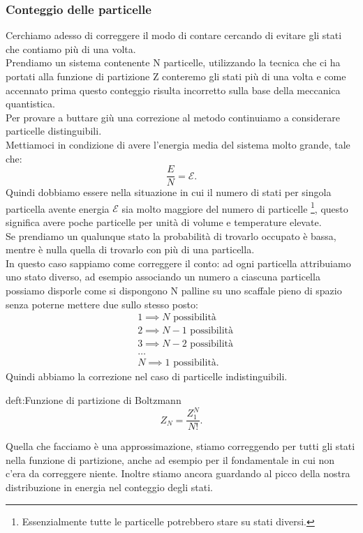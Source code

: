 \subsubsection{Conteggio delle particelle}%
\label{subsub:Conteggio delle particelle}
Cerchiamo adesso di correggere il modo di contare cercando di evitare gli stati che contiamo più di una volta.\\
Prendiamo un sistema contenente N particelle, utilizzando la tecnica che ci ha portati alla funzione di partizione Z conteremo gli stati più di una volta e come accennato prima questo conteggio risulta incorretto sulla base della meccanica quantistica.\\
Per provare a buttare giù una correzione al metodo continuiamo a considerare particelle distinguibili.\\
Mettiamoci in condizione di avere l'energia media del sistema molto grande, tale che:
\[
	\frac{E}{N} = \mathcal{E} 
.\] 
Quindi dobbiamo essere nella situazione in cui il numero di stati per singola particella avente energia $\mathcal{E}$ sia molto maggiore del numero di particelle \footnote{Essenzialmente tutte le particelle potrebbero stare su stati diversi.}, questo significa avere poche particelle per unità di volume e temperature elevate.\\
Se prendiamo un qualunque stato la probabilità di trovarlo occupato è bassa, mentre è nulla quella di trovarlo con più di una particella.\\
In questo caso sappiamo come correggere il conto: ad ogni particella attribuiamo uno stato diverso, ad esempio associando un numero a ciascuna particella possiamo disporle come si dispongono N palline su uno scaffale pieno di spazio senza poterne mettere due sullo stesso posto:
\begin{align}
	&1 \implies N \text{ possibilità}\\
	&2 \implies N-1 \text{ possibilità}\\
	&3 \implies N-2 \text{ possibilità}\\
	&\ldots\\
	&N \implies 1 \text{ possibilità}
.\end{align}
Quindi abbiamo la correzione nel caso di particelle indistinguibili.
\begin{defn}{deft:Funzione di partizione di Boltzmann}
\[
	Z_{N} = \frac{Z_1^{N}}{N!}
.\] 
\end{defn}
Quella che facciamo è una approssimazione, stiamo correggendo per tutti gli stati nella funzione di partizione, anche ad esempio per il fondamentale in cui non c'era da correggere niente. Inoltre stiamo ancora guardando al picco della nostra distribuzione in energia nel conteggio degli stati.\\
